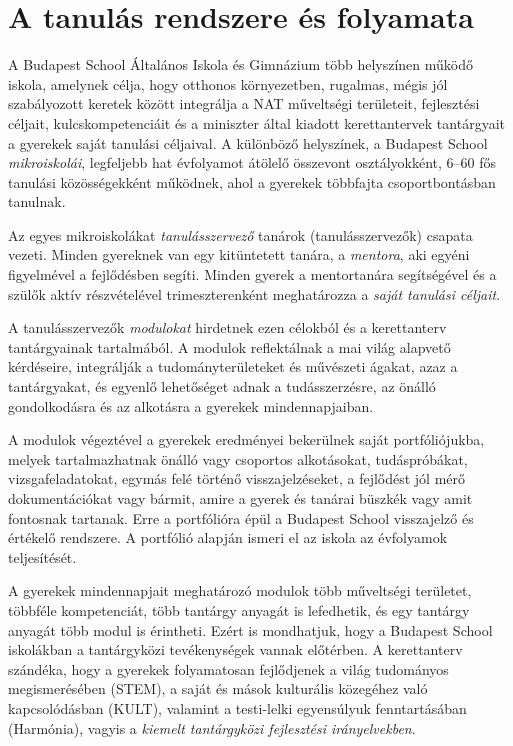 \section{A tanulás rendszere és folyamata}

A Budapest School Általános Iskola és Gimnázium több helyszínen működő iskola, amelynek célja, hogy otthonos környezetben, rugalmas, mégis jól szabályozott keretek között integrálja a NAT műveltségi területeit, fejlesztési céljait, kulcskompetenciáit és a miniszter által kiadott kerettantervek tantárgyait a gyerekek saját tanulási céljaival. A különböző helyszínek, a Budapest School \emph{mikroiskolái}, legfeljebb hat évfolyamot átölelő összevont osztályokként, 6--60 fős tanulási közösségekként működnek, ahol a gyerekek többfajta csoportbontásban tanulnak.

Az egyes mikroiskolákat \emph{tanulásszervező} tanárok (tanulásszervezők) csapata vezeti. Minden gyereknek van egy kitüntetett tanára, a \emph{mentora}, aki egyéni figyelmével a fejlődésben segíti. Minden gyerek a mentortanára segítségével és a szülők aktív részvételével trimeszterenként meghatározza a \emph{saját tanulási céljait}.

A tanulásszervezők \emph{modulokat} hirdetnek ezen célokból és a kerettanterv tantárgyainak tartalmából. A modulok reflektálnak a mai világ alapvető kérdéseire, integrálják	a tudományterületeket és mű\-vé\-sze\-ti á\-ga\-kat, azaz a tantárgyakat, és egyenlő lehetőséget adnak a tudásszerzésre, az önálló gondolkodásra és az alkotásra a gyerekek mindennapjaiban.

A modulok végeztével a gyerekek eredményei bekerülnek saját portfóliójukba, melyek tartalmazhatnak önálló vagy csoportos alkotásokat, tudáspróbákat, vizsgafeladatokat, egymás felé történő visszajelzéseket, a fejlődést jól mérő dokumentációkat vagy bármit, amire a gyerek és tanárai büszkék vagy amit fontosnak tartanak. Erre a portfólióra épül a Budapest School visszajelző és értékelő rendszere. A portfólió alapján ismeri el az iskola az évfolyamok teljesítését. 

A gyerekek mindennapjait meghatározó modulok több műveltségi területet, többféle kompetenciát, több tantárgy anyagát is lefedhetik, és egy tantárgy anyagát több modul is érintheti.
Ezért is mondhatjuk, hogy a Budapest School iskolákban a tantárgyközi tevékenységek vannak előtérben. 
A kerettanterv szándéka, hogy a gyerekek folyamatosan fejlődjenek a világ tudományos megismerésében (STEM), a saját és mások kulturális közegéhez való kapcsolódásban (KULT), valamint a testi-lelki egyensúlyuk fenntartásában (Harmónia), vagyis a \emph{kiemelt tantárgyközi fejlesztési irányelvekben}. 

